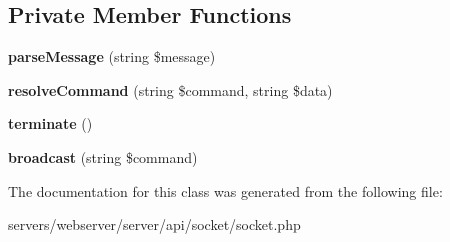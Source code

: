\subsection*{Private Member Functions}
\begin{DoxyCompactItemize}
\item 
\mbox{\label{class_lora_1_1_api_1_1_control_server_a14e8d4dad46db8bbfe6c8810a88cf155}} 
{\bfseries parse\+Message} (string \$message)
\item 
\mbox{\label{class_lora_1_1_api_1_1_control_server_ae6fb713e4c2900de8c57b949020384c3}} 
{\bfseries resolve\+Command} (string \$command, string \$data)
\item 
\mbox{\label{class_lora_1_1_api_1_1_control_server_aae6d2f0ed43d77087c71ffd4919dcf5d}} 
{\bfseries terminate} ()
\item 
\mbox{\label{class_lora_1_1_api_1_1_control_server_ab671527a81a457e51152cc532c716faa}} 
{\bfseries broadcast} (string \$command)
\end{DoxyCompactItemize}


The documentation for this class was generated from the following file\+:\begin{DoxyCompactItemize}
\item 
servers/webserver/server/api/socket/socket.\+php\end{DoxyCompactItemize}

